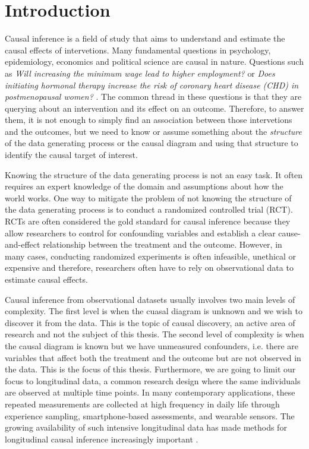 \chapter{Introduction}
\label{sec:introduction}

Causal inference is a field of study that aims to understand and estimate the 
causal effects of intervetions. Many fundamental questions in psychology, epidemiology, 
economics and political science are causal in nature. Questions such as \emph{Will 
increasing the minimum wage lead to higher employment?} \cite{cardMinimumWagesEmployment1993} or \emph{
    Does initiating hormonal therapy increase the risk of coronary heart disease (CHD) in postmenopausal women?
} \cite{hernanObservationalStudiesAnalyzed2008}. The common thread in these questions is that they 
are querying about an intervention and its effect on an outcome. Therefore, to answer them, it is not enough 
to simply find an association between those intervetions and the outcomes, but we need to know or assume 
something about
the \emph{structure} of the data generating process or the causal diagram 
and using that structure to identify the 
causal target of interest. 

Knowing the structure of the data generating process 
is not an easy task. 
It often requires an expert knowledge of the domain and assumptions about how the 
world works. One way to mitigate 
the problem of not knowing the structure of the data generating process is to conduct a randomized controlled trial (RCT). 
RCTs are often considered the gold standard for causal inference 
because they allow researchers to control for confounding variables and establish a 
clear cause-and-effect relationship between the treatment and the outcome. 
However, in many cases,
conducting randomized experiments is often infeasible, unethical or expensive and therefore, 
researchers often have to rely on observational data to estimate 
causal effects. 

Causal inference from observational datasets usually involves two 
main levels of  complexity.
The first level is when the 
cuasal diagram is unknown and we wish to discover it from the data. This is the topic of 
causal discovery, an active area of research and not the subject of this thesis. 
The second level of complexity is when the causal diagram is known but we have unmeasured confounders, i.e. 
there are variables that affect both the treatment and the outcome but are not observed in the data. This is the 
focus of this thesis. Furthermore, we are going to limit our focus to longitudinal data, a common research design where 
the same individuals are observed at multiple time points. In many contemporary applications, 
these repeated measurements are collected at high frequency in daily life through experience sampling, 
smartphone-based assessments, and wearable sensors. The growing availability of such intensive 
longitudinal data has made methods for longitudinal causal inference increasingly important \cite{myin-germeysExperienceSamplingMethodology2018}.
 
